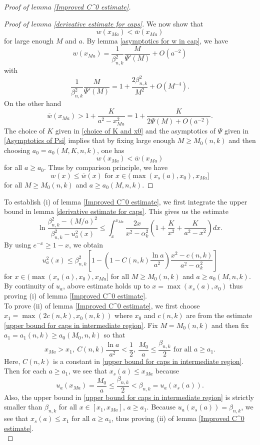 \documentclass[pdflatex,sn-mathphys-num]{sn-jnl}
\begin{document}
\begin{proof}[Proof of lemma \ref{Improved C^0 estimate}]
\begin{proof}[Proof of lemma \ref{derivative estimate for caps}]
    We now show that $$w(x_{Ma}) < \overline{w}(x_{Ma})$$
    for large enough $M$ and $a$. By lemma \ref{asymptotics for w in cap}, we have 
    $$w(x_{Ma}) = \frac{1}{\beta_{n,k}^2}\frac{M}{\Psi'(M)} + O(a^{-2})$$
    with
    $$\frac{1}{\beta_{n,k}^2}\frac{M}{\Psi'(M)} = 1 + \frac{2\beta_{n,k}^2}{M^2} + O(M^{-4}).$$
    On the other hand
    $$\overline{w}(x_{Ma}) > 1 + \frac{K}{a^2 - x_{Ma}^2} = 1 + \frac{K}{2\Psi(M) + O(a^{-2})}.$$
    The choice of $K$ given in \eqref{choice of K and x0} and the asymptotics of $\Psi$ given in \eqref{Asymptotics of Psi} implies that by fixing large enough $M \geq M_0(n,k)$ and then choosing $a_0 = a_0(M, K,n,k)$, one has
    \begin{equation}\label{comparison of w and overline w at tip in cap case}
        w(x_{Ma}) < \overline{w}(x_{Ma})
    \end{equation}
    for all $a \geq a_0$.
    Thus by comparison principle, we have
    $$w(x) \leq \overline{w}(x) \text{ for }x \in (\max(x_{s}(a), x_0), x_{Ma}]$$
    for all $M \geq M_0(n,k)$ and $a \geq a_0(M, n,k)$.
\end{proof}
To establish (i) of lemma \ref{Improved C^0 estimate}, we first integrate the upper bound in lemma \ref{derivative estimate for caps}. This gives us the estimate 
\begin{equation}
    \ln \frac{\beta_{n,k}^2 -(M/a)^2}{\beta_{n,k}^2 - u_a^2(x)}  \leq \int_{x}^{x_{Ma}}\frac{2x}{x^2 -\alpha_k^2}(1 + \frac{K}{x^2} + \frac{K}{a^2 - x^2})dx.
\end{equation}
By using $e^{-x} \geq 1 - x$, we obtain
\begin{equation}
    u_a^2(x) \leq \beta_{n,k}^2[1 -(1 - C(n,k)\frac{\ln a}{a^2})\frac{x^2 - c(n,k)}{a^2 - \alpha_k^2}]
\end{equation}
for $x \in (\max(x_{s}(a), x_0), x_{Ma}]$ for all $M \geq M_0(n,k)$ and $a \geq a_0(M, n,k)$. By continuity of $u_a$, above estimate holds up to $x = \max(x_{s}(a), x_0)$ thus proving (i) of lemma \ref{Improved C^0 estimate}.\\

 To prove (ii) of lemma \ref{Improved C^0 estimate}, we first choose $x_1 = \max(2c(n,k), x_0(n,k))$ where $x_0$ and $c(n,k)$ are from the estimate \eqref{upper bound for caps in intermediate region}. Fix $M = M_0(n,k)$ and then fix $a_1 = a_1(n,k) \geq a_0(M_0, n,k)$ so that
  $$x_{Ma} > x_1, \ C(n,k)\frac{\ln a}{a^2} < \frac{1}{2}, \ \frac{M_0}{a} \leq \frac{\beta_{n,k}}{2}\text{ for all }a \geq a_1.$$
Here, $C(n,k)$ is a constant in \eqref{upper bound for caps in intermediate region}.
Then for each $a \geq a_1$, we see that $x_{s}(a) \leq x_{Ma}$ because 
$$u_a(x_{Ma}) = \frac{M_0}{a} \leq \frac{\beta_{n,k}}{2} < \beta_{n,k} = u_a(x_{s}(a)).$$
Also, the upper bound in \eqref{upper bound for caps in intermediate region} is strictly smaller than $\beta_{n,k}$ for all $x \in [x_1, x_{Ma}]$, $a \geq a_1$. Because $u_a(x_{s}(a)) = \beta_{n,k}$, we see that $x_{s}(a) \leq x_1 $ for all $a \geq a_1$, thus proving (ii) of lemma \ref{Improved C^0 estimate}.\\


\end{proof}
\end{document}
